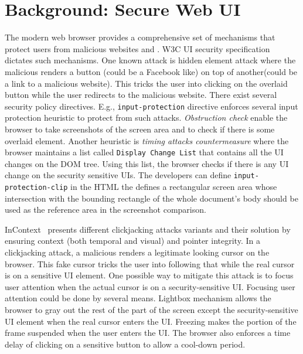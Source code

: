 \section{Background: Secure Web UI}
\label{sec:background}

The modern web browser provides a comprehensive set of mechanisms that protect users from malicious websites and \js. W3C UI security specification~\cite{w3c_spec} dictates such mechanisms. One known attack is hidden element attack where the malicious \js renders a button (could be a Facebook like) on top of another(could be a link to a malicious website). This tricks the user into clicking on the overlaid button while the user redirects to the malicious website. There exist several security policy directives. E.g., \texttt{input-protection} directive enforces several input protection heuristic to protect from such attacks.  \emph{Obstruction check} enable the browser to take screenshots of the screen area and to check if there is some overlaid element. Another heuristic is \emph{timing attacks countermeasure} where the browser maintains a list called \texttt{Display Change List} that contains all the UI changes on the DOM tree. Using this list, the browser checks if there is any UI change on the security sensitive UIs. The developers can define \texttt{input-protection-clip} in the HTML the defines a rectangular screen area whose intersection with the bounding rectangle of the whole document's body should be used as the reference area in the screenshot comparison.

InContext~\cite{huang2012clickjacking} presents different clickjacking attacks variants and their solution by ensuring context (both temporal and visual) and pointer integrity. In a clickjacking attack, a malicious \js renders a legitimate looking cursor on the browser. This fake cursor tricks the user into following that while the real cursor is on a sensitive UI element. One possible way to mitigate this attack is to focus user attention when the actual cursor is on a security-sensitive UI. Focusing user attention could be done by several means. Lightbox mechanism allows the browser to gray out the rest of the part of the screen except the security-sensitive UI element when the real cursor enters the UI. Freezing makes the portion of the frame suspended when the user enters the UI. The browser also enforces a time delay of clicking on a sensitive button to allow a cool-down period.  
